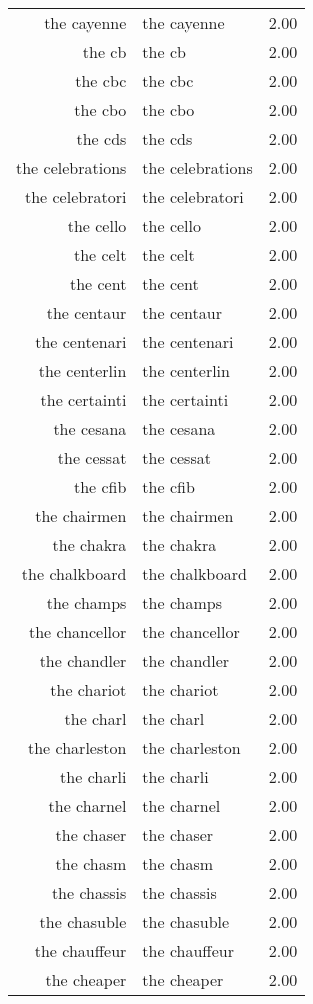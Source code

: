 \begin{table}[ht]
\begin{tabular}{rlr}
  the cayenne & the cayenne & 2.00 \\ 
  the cb & the cb & 2.00 \\ 
  the cbc & the cbc & 2.00 \\ 
  the cbo & the cbo & 2.00 \\ 
  the cds & the cds & 2.00 \\ 
  the celebrations & the celebrations & 2.00 \\ 
  the celebratori & the celebratori & 2.00 \\ 
  the cello & the cello & 2.00 \\ 
  the celt & the celt & 2.00 \\ 
  the cent & the cent & 2.00 \\ 
  the centaur & the centaur & 2.00 \\ 
  the centenari & the centenari & 2.00 \\ 
  the centerlin & the centerlin & 2.00 \\ 
  the certainti & the certainti & 2.00 \\ 
  the cesana & the cesana & 2.00 \\ 
  the cessat & the cessat & 2.00 \\ 
  the cfib & the cfib & 2.00 \\ 
  the chairmen & the chairmen & 2.00 \\ 
  the chakra & the chakra & 2.00 \\ 
  the chalkboard & the chalkboard & 2.00 \\ 
  the champs & the champs & 2.00 \\ 
  the chancellor & the chancellor & 2.00 \\ 
  the chandler & the chandler & 2.00 \\ 
  the chariot & the chariot & 2.00 \\ 
  the charl & the charl & 2.00 \\ 
  the charleston & the charleston & 2.00 \\ 
  the charli & the charli & 2.00 \\ 
  the charnel & the charnel & 2.00 \\ 
  the chaser & the chaser & 2.00 \\ 
  the chasm & the chasm & 2.00 \\ 
  the chassis & the chassis & 2.00 \\ 
  the chasuble & the chasuble & 2.00 \\ 
  the chauffeur & the chauffeur & 2.00 \\ 
  the cheaper & the cheaper & 2.00 \\ 

\end{tabular}
\end{table}
